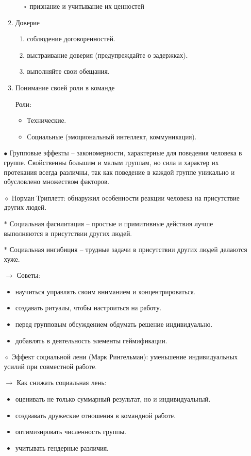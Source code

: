 \documentclass[12pt,a4paper]{report}
\begin{document}
\begin{enumerate}
	$\hspace{1em}\circ$ признание и учитывание их ценностей
	
\item Доверие
\begin{enumerate}
	\item соблюдение договоренностей.
	\item выстраивание доверия (предупреждайте о задержках).
	\item выполняйте свои обещания.
\end{enumerate}

\item Понимание своей роли в команде

Роли:
\begin{itemize}
	\item Технические.
	\item Социальные (эмоциональный интеллект, коммуникация).
\end{itemize}
\end{enumerate}

\medskip
$\bullet$ Групповые эффекты -- закономерности, характерные для поведения человека в 
группе. Свойственны большим и малым группам, но сила и характер их протекания всегда 
различны, так как поведение в каждой группе уникально и обусловлено множеством факторов.

\bigskip
$\diamond$ Норман Триплетт: обнаружил особенности реакции человека на присутствие других людей.

\medskip
$\ast$ Социальная фасилитация -- простые и примитивные действия лучше выполняются в присутствии других людей.

\medskip 
$\ast$ Социальная ингибиция -- трудные задачи в присутствии других людей делаются хуже.

\medskip
$\rightarrow$ Советы:
\begin{itemize}
	\item научиться управлять своим вниманием и концентрироваться.
	\item создавать ритуалы, чтобы настроиться на работу.
	\item перед групповым обсуждением обдумать решение индивидуально.
	\item добавлять в деятельность элементы геймификации.
\end{itemize}

\bigskip
$\diamond$ Эффект социальной лени (Марк Рингельман): уменьшение индивидуальных усилий при совместной работе.

\medskip
$\rightarrow$ Как снижать социальная лень:
\begin{itemize}
	\item оценивать не только суммарный результат, но и индивидуальный.
	\item создвавать дружеские отношения в командной работе.
	\item оптимизировать численность группы.
	\item учитывать гендерные различия. 
\end{itemize}
\end{document}

